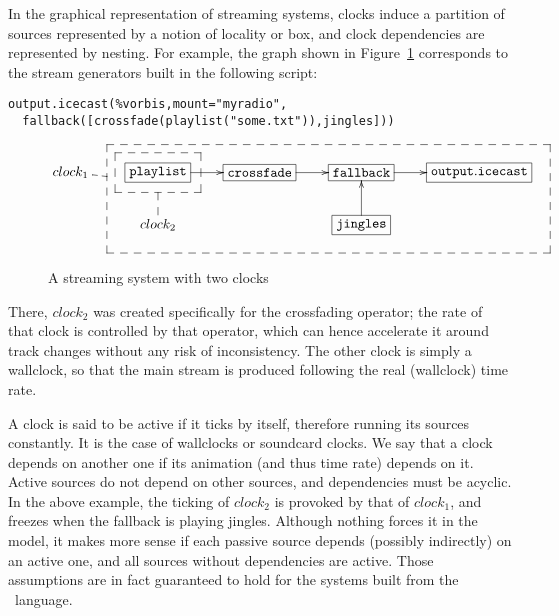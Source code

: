 In the graphical representation of streaming systems,
clocks induce a partition of sources represented by a notion of locality
or box, and clock dependencies are represented by nesting.
For example, the graph shown in Figure~\ref{fig:boxes}
corresponds to the stream generators built in the following
script:
\begin{verbatim}
output.icecast(%vorbis,mount="myradio",
  fallback([crossfade(playlist("some.txt")),jingles]))
\end{verbatim}

\begin{figure}[t]
 \begin{center}
\[
\def\f{\save
*+<15pt>[F--]\frm{}\ar @{--} "2,2"\restore}%
\def\g{\save
"2,4"."1,2"."1,5"!C*+<27pt>[F--]\frm{}\ar @{--} "1,1"\restore}%
\xymatrix{
   {clock_1} & *+[F]{\mathtt{playlist}}\ar[r]\f&*+[F]{\mathtt{crossfade}}\ar[r]&  *+[F]{\mathtt{fallback}}\ar[r]&
  *+[F]{\mathtt{output.icecast}}\\
   &{clock_2} &  & *+[F]{\mathtt{jingles}}\ar[u]\g& 
}
\]
\end{center}
 \caption{A streaming system with two clocks}
 \label{fig:boxes}
\end{figure}

There, $clock_2$
was created specifically for the crossfading
operator; the rate of that clock is controlled by that operator,
which can hence accelerate it around track changes without any
risk of inconsistency.
The other clock is simply a wallclock, so that the main stream
is produced following the real (wallclock) time rate.

A clock is said to be active if it ticks by itself,
therefore running its sources constantly.
It is the case of wallclocks or soundcard clocks.
We say that a clock depends on another one
if its animation (and thus time rate) depends on it.
Active sources do not depend on other sources,
and dependencies must be acyclic.
In the above example, the ticking of
$clock_2$ is provoked by that of
$clock_1$, and freezes when the fallback
is playing jingles.
Although nothing forces it in the model, it makes more sense if
each passive source depends (possibly indirectly) on an active one,
and all sources without dependencies are active.
Those assumptions are in fact guaranteed to hold for the systems
built from the \liquidsoap\ language.


